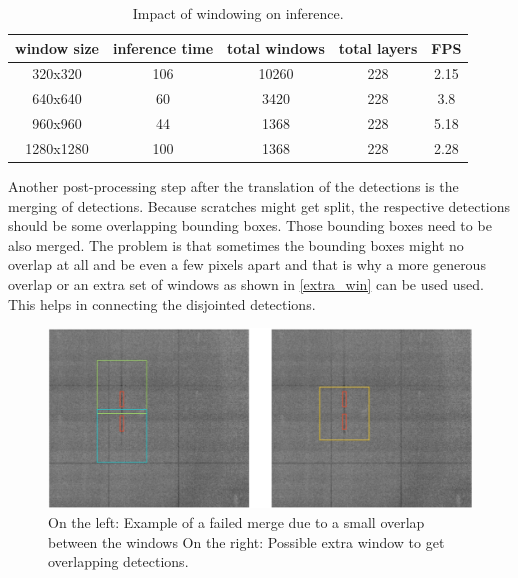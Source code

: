 \begin{table}
\centering
\begin{tabular}{ ||c|c|c|c|c||}
\hline
window size & inference time & total windows & total layers & FPS\\ [0.5ex]
\hline\hline
320x320 & 106 & 10260 & 228 & 2.15 \\
640x640 & 60 & 3420 & 228 & 3.8 \\
960x960 & 44 & 1368  & 228 & 5.18 \\
1280x1280 & 100 & 1368 & 228 & 2.28 \\
\hline
\end{tabular}
\label{impl:win_inference}
\caption{Impact of windowing on inference.}
\end{table}

Another post-processing step after the translation of the detections is the merging of detections. Because scratches might get split, the respective detections should be some overlapping bounding boxes. Those bounding boxes need to be also merged. The problem is that sometimes the bounding boxes might no overlap at all and be even a few pixels apart and that is why a more generous overlap or an extra set of windows as shown in \ref{extra_win} can be used used. This helps in connecting the disjointed detections. \\

\begin{figure}[!h]
\centering
\captionsetup{justification=centering,margin=2cm}
\includegraphics[width=\columnwidth]{images/implementation/extra_windows}
\caption{On the left: Example of a failed merge due to a small overlap between the windows On the right: Possible extra window to get overlapping detections. }
\label{impl:extra_win}
\end{figure}

